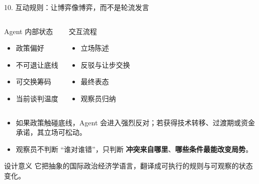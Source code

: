\documentclass[aspectratio=169,10.5pt]{ctexbeamer}
\begin{document}
\begin{frame}{10. 互动规则：让博弈像博弈，而不是轮流发言}
  \begin{columns}[T]
    \begin{block}{Agent 内部状态}
      \begin{itemize}
        \item 政策偏好
        \item 不可退让底线
        \item 可交换筹码
        \item 当前谈判温度
      \end{itemize}
    \end{block}
    \begin{block}{交互流程}
      \begin{itemize}
        \item 立场陈述
        \item 反驳与让步交换
        \item 最终表态
        \item 观察员归纳
      \end{itemize}
    \end{block}
  \end{columns}
  \begin{itemize}
    \item 如果政策触碰底线，Agent 会进入强烈反对；若获得技术转移、过渡期或资金承诺，其立场可松动。
    \item 观察员不判断 ``谁对谁错''，只判断 \textbf{冲突来自哪里}、\textbf{哪些条件最能改变局势}。
  \end{itemize}
  \begin{alertblock}{设计意义}
    它把抽象的国际政治经济学语言，翻译成可执行的规则与可观察的状态变化。
  \end{alertblock}
\end{frame}
\end{document}

